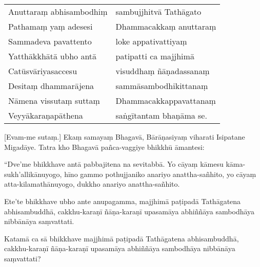 \begin{leader}

\begin{tabular}{l l}
Anuttaraṃ abhisambodhiṃ & sambujjhitvā Tathāgato\\
Pathamaṃ yaṃ adesesi & Dhammacakkaṃ anuttaraṃ\\
Sammadeva pavattento & loke appativattiyaṃ\\
Yatthākkhātā ubho antā & patipatti ca majjhimā\\
Catūsvāriyasaccesu & visuddhaṃ ñāṇadassanaṃ\\
Desitaṃ dhammarājena & sammāsambodhikittanaṃ\\
Nāmena vissutaṃ suttaṃ & Dhammacakkappavattanaṃ\\
Veyyākaraṇapāthena & saṅgītantam bhaṇāma se.
\end{tabular}
\end{leader}

[Evam-me sutaṃ.] Ekaṃ samayaṃ Bhagavā, Bārāṇasiyaṃ viharati Isipatane
Migadāye.  Tatra kho Bhagavā pañca-vaggiye bhikkhū āmantesi:

“Dve’me bhikkhave antā pabbajitena na sevitabbā.
Yo cāyaṃ
kāmesu kāma-sukh’allikānuyogo, hīno gammo pothujjaniko anariyo
anattha-sañhito, yo cāyaṃ atta-kilamathānuyogo, dukkho anariyo
anattha-sañhito.

Ete’te bhikkhave ubho ante anupagamma, majjhimā
paṭipadā Tathāgatena abhisambuddhā, cakkhu-karaṇī ñāṇa-karaṇī upasamāya
abhiññāya sambodhāya nibbānāya saṃvattati.

Katamā ca sā bhikkhave majjhimā paṭipadā Tathāgatena abhisambuddhā,
cakkhu-karaṇī ñāṇa-karaṇī upasamāya abhiññāya sambodhāya nibbānāya
saṃvattati?


